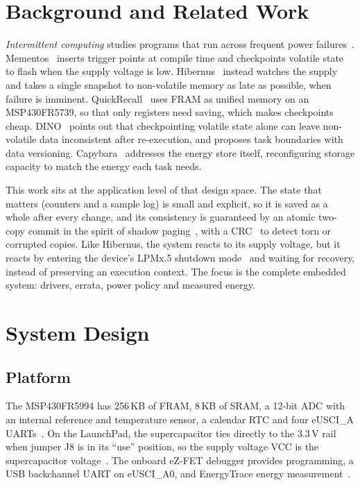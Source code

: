 \documentclass[conference]{IEEEtran}
\begin{document}
\section{Background and Related Work}
\label{sec:related}

\emph{Intermittent computing} studies programs that run across frequent power failures~\cite{lucia2017snapl}. Mementos~\cite{ransford2011mementos} inserts trigger points at compile time and checkpoints volatile state to flash when the supply voltage is low. Hibernus~\cite{balsamo2015hibernus} instead watches the supply and takes a single snapshot to non-volatile memory as late as possible, when failure is imminent. QuickRecall~\cite{jayakumar2014quickrecall} uses FRAM as unified memory on an MSP430FR5739, so that only registers need saving, which makes checkpoints cheap. DINO~\cite{lucia2015dino} points out that checkpointing volatile state alone can leave non-volatile data inconsistent after re-execution, and proposes task boundaries with data versioning. Capybara~\cite{colin2018capybara} addresses the energy store itself, reconfiguring storage capacity to match the energy each task needs.

This work sits at the application level of that design space. The state that matters (counters and a sample log) is small and explicit, so it is saved as a whole after every change, and its consistency is guaranteed by an atomic two-copy commit in the spirit of shadow paging~\cite{lorie1977physical}, with a CRC~\cite{koopman2004crc} to detect torn or corrupted copies. Like Hibernus, the system reacts to its supply voltage, but it reacts by entering the device's LPMx.5 shutdown mode~\cite{ti_slau367} and waiting for recovery, instead of preserving an execution context. The focus is the complete embedded system: drivers, errata, power policy and measured energy.

\section{System Design}
\label{sec:design}

\subsection{Platform}

The MSP430FR5994 has 256\,KB of FRAM, 8\,KB of SRAM, a 12-bit ADC with an internal reference and temperature sensor, a calendar RTC and four eUSCI\_A UARTs~\cite{ti_slase54}. On the LaunchPad, the supercapacitor ties directly to the 3.3\,V rail when jumper J8 is in its ``use'' position, so the supply voltage VCC is the supercapacitor voltage~\cite{ti_slau678}. The onboard eZ-FET debugger provides programming, a USB backchannel UART on eUSCI\_A0, and EnergyTrace energy measurement~\cite{ti_slaa603}.
\end{document}
